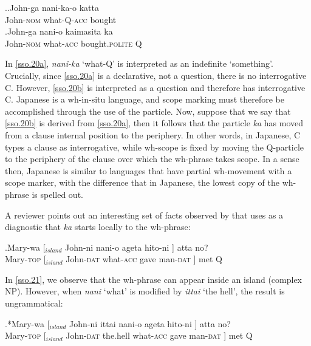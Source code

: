 \documentclass[charis]{glossa}
\begin{document}
\ex.\ag.\label{sso.20a}John-ga nani-ka-o katta\\
  John-\textsc{nom} what-Q-\textsc{acc} bought\\
  \bg.\label{sso.20b}John-ga nani-o kaimasita ka\\
  John-\textsc{nom} what-\textsc{acc} bought.\textsc{polite} Q\\

In \ref{sso.20a}, \textit{nani-ka} `what-Q' is interpreted as an indefinite `something'. Crucially, since \ref{sso.20a} is a declarative, not a question, there is no interrogative C. However, \ref{sso.20b} is interpreted as a question and therefore has interrogative C. Japanese is a wh-in-situ language, and scope marking must therefore be accomplished through the use of the particle. Now, suppose that we say that \ref{sso.20b} is derived from \ref{sso.20a}, then it follows that the particle \textit{ka} has moved from a clause internal position to the periphery. In other words, in Japanese, C types a clause as interrogative, while wh-scope is fixed by moving the Q-particle to the periphery of the clause over which the wh-phrase takes scope. In a sense then, Japanese is similar to languages that have partial wh-movement with a scope marker, with the difference that in Japanese, the lowest copy of the wh-phrase is spelled out.

A reviewer points out an interesting set of facts observed by \cite{pesetsky:1987} that \cite{hagstrom:1998} uses as a diagnostic that \textit{ka} starts locally to the wh-phrase:

\exg.\label{sso.21}Mary-wa [$_{island}$ John-ni nani-o ageta hito-ni ] atta no?\\
   Mary-\textsc{top} [$_{island}$ John-\textsc{dat} what-\textsc{acc} gave man-\textsc{dat} ] met Q\\

In \ref{sso.21}, we observe that the wh-phrase can appear inside an island (complex NP). However, when \textit{nani} `what' is modified by \textit{ittai} `the hell', the result is ungrammatical:

\exg.*\label{sso.22}Mary-wa [$_{island}$ John-ni ittai nani-o ageta hito-ni ] atta no?\\
   Mary-\textsc{top} [$_{island}$ John-\textsc{dat} the.hell what-\textsc{acc} gave man-\textsc{dat} ] met Q\\
\end{document}
